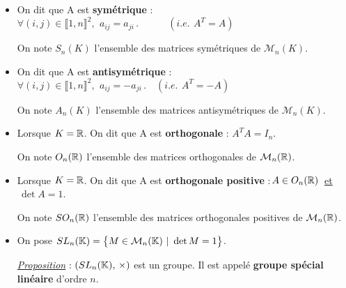 \begin{itemize}[leftmargin=0cm,rightmargin=0cm, label=•]
    \item On dit que A est \textbf{symétrique} \ssi : \(\forall (i,j)\in \llbracket 1,n \rrbracket^2,\ \, a_{ij}=a_{ji}\,.\qquad \quad (i.e.\ \, A^{T}=A)\)\vspace{0.1cm}\\
    \begin{small}
        On note \(S_n(K)\) l'ensemble des matrices symétriques de \(\mathcal{M}_n(K)\).
    \end{small}\vspace{0.2cm}

    \item On dit que A est \textbf{antisymétrique} \ssi : \(\forall (i,j)\in \llbracket 1,n \rrbracket^2,\ \, a_{ij}=-a_{ji}\,.\quad (i.e.\ \, A^{T}=-A)\)\vspace{0.1cm}\\
    \begin{small}
        On note \(A_n(K)\) l'ensemble des matrices antisymétriques de \(\mathcal{M}_n(K)\).
    \end{small}\vspace{0.2cm}

    \item Lorsque \(K=\mathbb{R}\). On dit que A est \textbf{orthogonale} \ssi : \(A^TA=I_n\).\vspace{0.1cm}\\
    \begin{small}
        On note \(O_n(\mathbb{R})\) l'ensemble des matrices orthogonales de \(\mathcal{M}_n(\mathbb{R})\).
    \end{small}\vspace{0.2cm}

    \item Lorsque \(K=\mathbb{R}\). On dit que A est \textbf{orthogonale positive} \ssi :\(\,A\in O_n(\mathbb{R})\,\) \underline{et} \(\,\det A=1\).\vspace{0.1cm}\\
    \begin{small}
        On note \(SO_n(\mathbb{R})\) l'ensemble des matrices orthogonales positives de \(\mathcal{M}_n(\mathbb{R})\).
    \end{small}\vspace{0.2cm}

    \item On pose \(SL_n(\mathbb{K})=\bigl\{M\in \mathcal{M}_n(\mathbb{K}) \ \vert \ \det M=1 \bigr\}\).\vspace{0.1cm}\\
    \begin{small}
        \underline{\emph{Proposition}} : \((SL_n(\mathbb{K}),\,\times)\) est un groupe. Il est appelé \textbf{groupe spécial linéaire} d'ordre $n$.
    \end{small}\vspace{0.3cm}


\end{itemize}
